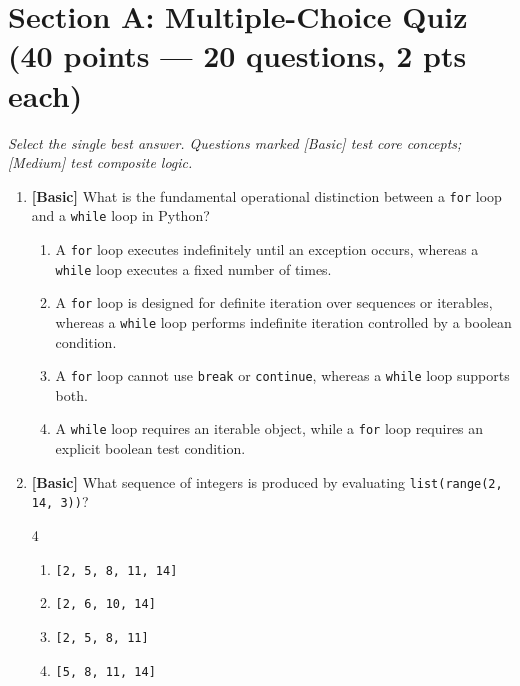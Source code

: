 \documentclass[11pt,a4paper]{article}
\begin{document}
\vspace{2.5mm}
\section*{Section A: Multiple-Choice Quiz \hfill \normalsize\normalfont(40 points --- 20 questions, 2 pts each)}
\textit{Select the single best answer. Questions marked [Basic] test core concepts; [Medium] test composite logic.}

\begin{enumerate}[label=\textbf{Q\arabic*.},leftmargin=1.8em,itemsep=0.6pt,topsep=0.2pt]

\item \textbf{[Basic]} What is the fundamental operational distinction between a \texttt{for} loop and a \texttt{while} loop in Python?
\begin{enumerate}[label=\Alph*.,leftmargin=1.8em]
  \item A \texttt{for} loop executes indefinitely until an exception occurs, whereas a \texttt{while} loop executes a fixed number of times.
  \item A \texttt{for} loop is designed for definite iteration over sequences or iterables, whereas a \texttt{while} loop performs indefinite iteration controlled by a boolean condition.
  \item A \texttt{for} loop cannot use \texttt{break} or \texttt{continue}, whereas a \texttt{while} loop supports both.
  \item A \texttt{while} loop requires an iterable object, while a \texttt{for} loop requires an explicit boolean test condition.
\end{enumerate}

\item \textbf{[Basic]} What sequence of integers is produced by evaluating \texttt{list(range(2, 14, 3))}?
\begin{multicols}{4}
\begin{enumerate}[label=\Alph*.]
  \item \texttt{[2, 5, 8, 11, 14]}
  \item \texttt{[2, 6, 10, 14]}
  \item \texttt{[2, 5, 8, 11]}
  \item \texttt{[5, 8, 11, 14]}
\end{enumerate}
\end{multicols}


\end{enumerate}
\end{document}
